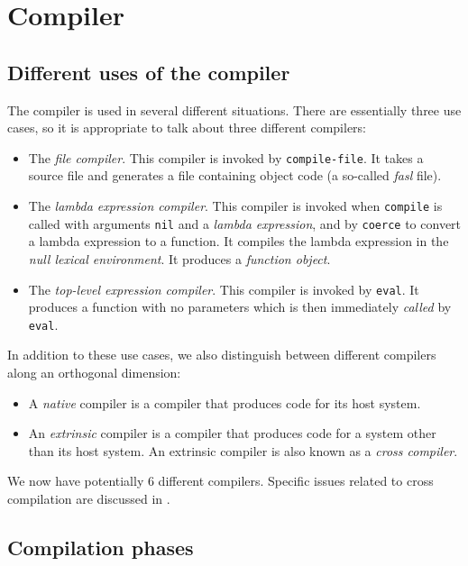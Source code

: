 \chapter{Compiler}
\label{chap-compiler}

\section{Different uses of the compiler}

The compiler is used in several different situations.  There are
essentially three use cases, so it is appropriate to talk about three
different compilers:

\begin{itemize}
\item The \emph{file compiler}.  This compiler is invoked by
  \texttt{compile-file}.  It takes a \cl{} source file and generates a
  file containing object code (a so-called \emph{fasl} file). 
\item The \emph{lambda expression compiler}.  This compiler is invoked
  when \texttt{compile} is called with arguments \texttt{nil} and a
  \emph{lambda expression}, and by \texttt{coerce} to convert a lambda
  expression to a function.  It compiles the lambda expression in the
  \emph{null lexical environment}.  It produces a \emph{function
    object}.
\item The \emph{top-level expression compiler}.  This compiler is
  invoked by \texttt{eval}.  It produces a function with no parameters
  which is then immediately \emph{called} by \texttt{eval}.  
\end{itemize}

In addition to these use cases, we also distinguish between different
compilers along an orthogonal dimension:

\begin{itemize}
\item A \emph{native} compiler is a compiler that produces code for
  its host \cl{} system. 
\item An \emph{extrinsic} compiler is a compiler that produces code
  for a \cl{} system other than its host system.  An extrinsic
  compiler is also known as a \emph{cross compiler}.
\end{itemize}

We now have potentially 6 different compilers.  Specific issues
related to cross compilation are discussed in
. 

\section{Compilation phases}

